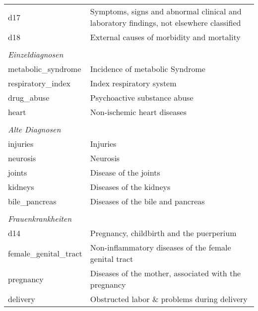 \begin{table}[H]
\begin{tabular}{ll}
	\hspace{4pt} d17  &       Symptoms, signs and abnormal clinical and laboratory findings, not elsewhere classified \\
	\hspace{4pt} d18  &       External causes of morbidity and mortality \\
\\
\emph{Einzeldiagnosen} \\ 
	\hspace{4pt} metabolic\_syndrome  &       Incidence of metabolic Syndrome \\
	\hspace{4pt} respiratory\_index  &       Index respiratory system \\
	\hspace{4pt} drug\_abuse  &       Psychoactive substance abuse \\
	\hspace{4pt} heart  &       Non-ischemic heart diseases \\
\\
\emph{Alte Diagnosen}\\
	\hspace{4pt} injuries  &       Injuries \\
	\hspace{4pt} neurosis  &       Neurosis \\
	\hspace{4pt} joints  &       Disease of the joints \\
	\hspace{4pt} kidneys  &       Diseases of the kidneys \\
	\hspace{4pt} bile\_pancreas  &       Diseases of the bile and pancreas \\
\\
\emph{Frauenkrankheiten}\\
	\hspace{4pt} d14  &       Pregnancy, childbirth and the puerperium \\
	\hspace{4pt} female\_genital\_tract  &       Non-inflammatory diseases of the female genital tract \\
	\hspace{4pt} pregnancy  &       Diseases of the mother, associated with the pregnancy \\
	\hspace{4pt} delivery  &       Obstructed labor \& problems during delivery \\

\end{tabular}
\end{table}
